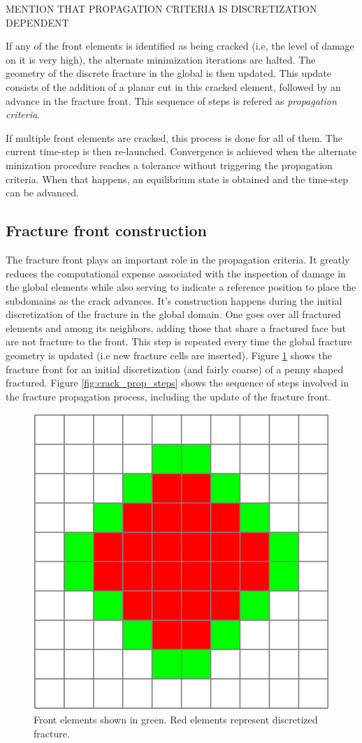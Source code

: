 MENTION THAT PROPAGATION CRITERIA IS DISCRETIZATION DEPENDENT

If any of the front elements is identified as being cracked (i.e, the level of damage on it is very high), the alternate minimization iterations are halted. The geometry of the discrete fracture in the global is then updated. This update consists of the addition of a planar cut in this cracked element, followed by an advance in the fracture front. This sequence of steps is refered as \textit{propagation criteria}.

If multiple front elements are cracked, this process is done for all of them. The current time-step is then re-launched. Convergence is achieved when the alternate minization procedure reaches a tolerance without triggering the propagation criteria. When that happens, an equilibrium state is obtained and the time-step can be advanced.

\subsection{Fracture front construction}

The fracture front plays an important role in the propagation criteria. It greatly reduces the computational expense associated with the inspection of damage in the global elements while also serving to indicate a reference position to place the subdomains as the crack advances. It's construction happens during the initial discretization of the fracture in the global domain. One goes over all fractured elements and among its neighbors, adding those that share a fractured face but are not fracture to the front. This step is repeated every time the global fracture geometry is updated (i.e new fracture cells are inserted). Figure \ref{fig:crack_front} shows the fracture front for an initial discretization (and fairly coarse) of a penny shaped fractured.
Figure \ref{fig:crack_prop_steps} shows the sequence of steps involved in the fracture propagation process, including the update of the fracture front.

\begin{figure}[h]
    \centering
    \includegraphics[width=0.4\linewidth]{Chapter4/figures/front_penny.png}
    \caption{Front elements shown in green. Red elements represent discretized fracture.}
    \label{fig:crack_front}
\end{figure}

